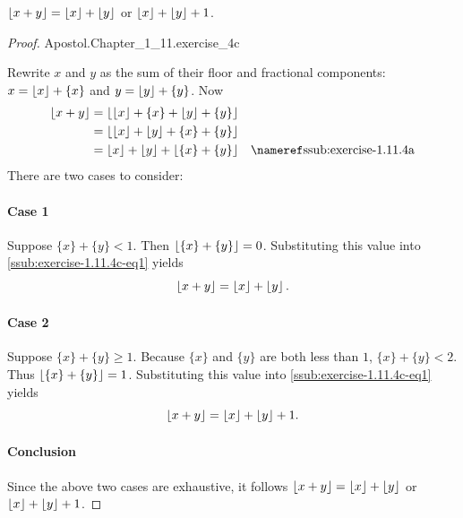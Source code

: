 \documentclass{report}
\begin{document}
\subsubsection{}%
\label{ssub:exercise-1.11.4c}

$\left\lfloor x + y\right\rfloor = \left\lfloor x\right\rfloor + \left\lfloor y\right\rfloor$ or $\left\lfloor x\right\rfloor + \left\lfloor y\right\rfloor + 1$.

\begin{proof}

    {Apostol.Chapter\_1\_11.exercise\_4c}

  Rewrite $x$ and $y$ as the sum of their floor and fractional components:
    $x = \left\lfloor x\right\rfloor + \{x\}$ and $y = \left\lfloor y\right\rfloor + \{y\}$.
  Now
    \begin{align}
      \floor{x + y}
        & = \floor{\floor{x} + \{x\} + \floor{y} + \{y\}} \nonumber \\
        & = \floor{\floor{x} + \floor{y} + \{x\} + \{y\}} \nonumber \\
        & = \floor{x} + \floor{y} + \floor{\{x\} + \{y\}}
          & \textref{ssub:exercise-1.11.4a} \label{ssub:exercise-1.11.4c-eq1}
    \end{align}
  There are two cases to consider:

  \paragraph{Case 1}%

    Suppose $\{x\} + \{y\} < 1$.
    Then $\left\lfloor\{x\} + \{y\}\right\rfloor = 0$.
    Substituting this value into \eqref{ssub:exercise-1.11.4c-eq1} yields
      $$\left\lfloor x + y\right\rfloor = \left\lfloor x\right\rfloor + \left\lfloor y\right\rfloor.$$

  \paragraph{Case 2}%

    Suppose $\{x\} + \{y\} \geq 1$.
    Because $\{x\}$ and $\{y\}$ are both less than $1$, $\{x\} + \{y\} < 2$.
    Thus $\left\lfloor\{x\} + \{y\}\right\rfloor = 1$.
    Substituting this value into \eqref{ssub:exercise-1.11.4c-eq1} yields
      $$\left\lfloor x + y\right\rfloor = \left\lfloor x\right\rfloor + \left\lfloor y\right\rfloor + 1.$$

  \paragraph{Conclusion}%

    Since the above two cases are exhaustive, it follows
      $\left\lfloor x + y\right\rfloor = \left\lfloor x\right\rfloor + \left\lfloor y\right\rfloor$ or $\left\lfloor x\right\rfloor + \left\lfloor y\right\rfloor + 1$.

\end{proof}
\end{document}
